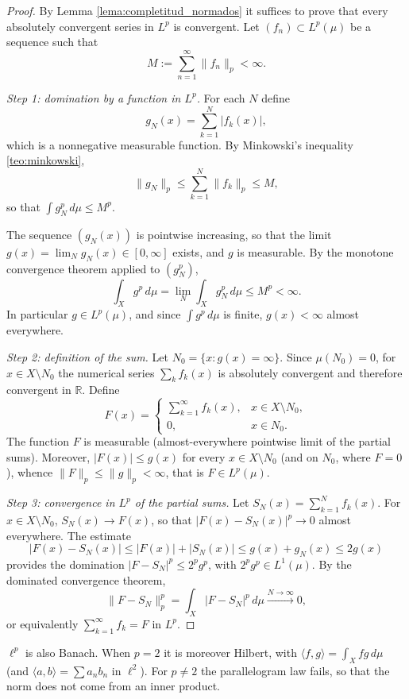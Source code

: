 \documentclass[11pt, a4paper]{article}
\begin{document}
\begin{proof}
By Lemma \ref{lema:completitud_normados} it suffices to prove that every absolutely convergent series in $L^p$ is
convergent. Let $(f_n) \subset L^p(\mu)$ be a sequence such that
$$ M := \sum_{n=1}^{\infty} \|f_n\|_p < \infty. $$

\textit{Step 1: domination by a function in $L^p$.} For each $N$ define
$$ g_N(x) = \sum_{k=1}^{N} |f_k(x)|, $$
which is a nonnegative measurable function. By Minkowski's inequality \ref{teo:minkowski},
$$ \|g_N\|_p \le \sum_{k=1}^N \|f_k\|_p \le M, $$
so that $\int g_N^p \, d\mu \le M^p$.

The sequence $(g_N(x))$ is pointwise increasing, so that the limit
$g(x) = \lim_N g_N(x) \in [0, \infty]$ exists, and $g$ is measurable. By the monotone convergence theorem
applied to $(g_N^p)$,
$$ \int_X g^p \, d\mu = \lim_N \int_X g_N^p \, d\mu \le M^p < \infty. $$
In particular $g \in L^p(\mu)$, and since $\int g^p \, d\mu$ is finite, $g(x) < \infty$ almost
everywhere.

\textit{Step 2: definition of the sum.} Let $N_0 = \{x : g(x) = \infty\}$. Since $\mu(N_0) = 0$,
for
$x \in X \setminus N_0$ the numerical series $\sum_k f_k(x)$ is absolutely convergent and therefore
convergent in $\mathbb{R}$. Define
$$ F(x) = \begin{cases} \displaystyle\sum_{k=1}^{\infty} f_k(x), & x \in X \setminus N_0, \\
0, & x \in N_0. \end{cases} $$
The function $F$ is measurable (almost-everywhere pointwise limit of the partial sums). Moreover,
$|F(x)| \le g(x)$ for every $x \in X \setminus N_0$ (and on $N_0$, where $F = 0$), whence
$\|F\|_p \le \|g\|_p < \infty$, that is $F \in L^p(\mu)$.

\textit{Step 3: convergence in $L^p$ of the partial sums.} Let $S_N(x) = \sum_{k=1}^N f_k(x)$.
For $x \in X \setminus N_0$, $S_N(x) \to F(x)$, so that $|F(x) - S_N(x)|^p \to 0$ almost
everywhere. The estimate
$$ |F(x) - S_N(x)| \le |F(x)| + |S_N(x)| \le g(x) + g_N(x) \le 2 g(x) $$
provides the domination $|F - S_N|^p \le 2^p g^p$, with $2^p g^p \in L^1(\mu)$. By the dominated
convergence theorem,
$$ \|F - S_N\|_p^p = \int_X |F - S_N|^p \, d\mu \xrightarrow{N \to \infty} 0, $$
or equivalently $\sum_{k=1}^{\infty} f_k = F$ in $L^p$.
\end{proof}

\obs $\ell^p$ is also Banach. When $p = 2$ it is moreover Hilbert, with
$\langle f, g \rangle = \int_X fg \, d\mu$ (and $\langle a, b \rangle = \sum a_n b_n$ in $\ell^2$).
For $p \ne 2$ the parallelogram law fails, so that the norm does not come from an inner
product.
\end{document}

